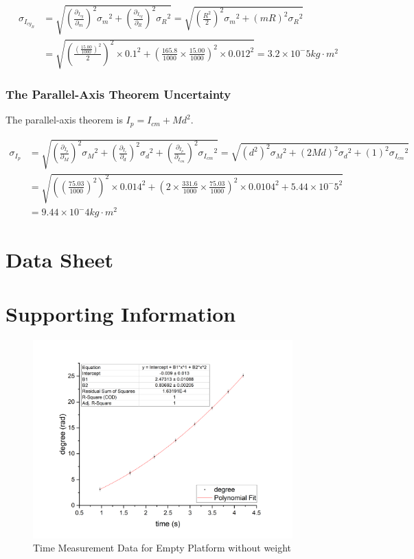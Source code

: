 \documentclass[12pt,a4paper]{article}
\begin{document}
    $$
    \begin{aligned}
    \sigma_{I_{cy_B}}&=\sqrt{(\frac{\partial_{I_{cy}}}{\partial_m})^2{\sigma_m}^2+(\frac{\partial_{I_{cy}}}{\partial_R})^2{\sigma_R}^2}=\sqrt{(\frac{R^2}{2})^2{\sigma_m}^2+(mR)^2{\sigma_R}^2}\\
    &=\sqrt{(\frac{(\frac{15.00}{1000})^2}{2})^2\times{0.1}^2+(\frac{165.8}{1000}\times \frac{15.00}{1000})^2\times{0.012}^2}=3.2\times 10^-5kg\cdot m^2
    \end{aligned}
    $$ 

\subsubsection{The Parallel-Axis Theorem Uncertainty}
The parallel-axis theorem is $I_p=I_{cm}+Md^2$.

$$
\begin{aligned}
\sigma_{I_p}&=\sqrt{(\frac{\partial_{I_p}}{\partial_M})^2{\sigma_M}^2+(\frac{\partial_{I_c}}{\partial_{d}})^2{\sigma_{d}}^2+(\frac{\partial_{I_p}}{\partial_{I_{cm}}})^2{\sigma_{I_{cm}}}^2}=\sqrt{(d^2)^2{\sigma_M}^2+(2Md)^2{\sigma_{d}}^2+(1)^2{\sigma_{I_{cm}}}^2}\\
&=\sqrt{((\frac{75.03}{1000})^2)^2\times{0.014}^2+(2\times\frac{331.6}{1000}\times\frac{75.03}{1000})^2\times{0.0104}^2+{5.44\times 10^-5}^2}\\
&=9.44\times 10^-4 kg\cdot m^2
\end{aligned}
$$

\section{Data Sheet}


\section{Supporting Information}

\begin{figure}[h]
    \centering
    \includegraphics[width=10cm]{emptyw.png}
    \caption{Time Measurement Data for Empty Platform without weight}
\end{figure}
\end{document}
